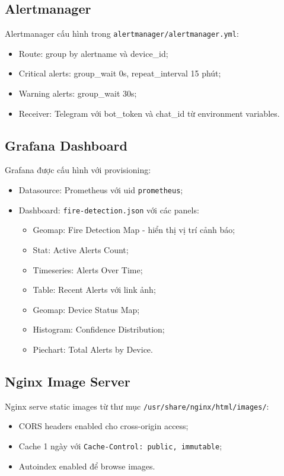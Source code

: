 \documentclass[12pt,a4paper]{report}
\begin{document}
\subsection{Alertmanager}

Alertmanager cấu hình trong \texttt{alertmanager/alertmanager.yml}:
\begin{itemize}
  \item Route: group by alertname và device\_id;
  \item Critical alerts: group\_wait 0s, repeat\_interval 15 phút;
  \item Warning alerts: group\_wait 30s;
  \item Receiver: Telegram với bot\_token và chat\_id từ environment variables.
\end{itemize}

\subsection{Grafana Dashboard}

Grafana được cấu hình với provisioning:
\begin{itemize}
  \item Datasource: Prometheus với uid \texttt{prometheus};
  \item Dashboard: \texttt{fire-detection.json} với các panels:
    \begin{itemize}
      \item Geomap: Fire Detection Map - hiển thị vị trí cảnh báo;
      \item Stat: Active Alerts Count;
      \item Timeseries: Alerts Over Time;
      \item Table: Recent Alerts với link ảnh;
      \item Geomap: Device Status Map;
      \item Histogram: Confidence Distribution;
      \item Piechart: Total Alerts by Device.
    \end{itemize}
\end{itemize}

\subsection{Nginx Image Server}

Nginx serve static images từ thư mục \texttt{/usr/share/nginx/html/images/}:
\begin{itemize}
  \item CORS headers enabled cho cross-origin access;
  \item Cache 1 ngày với \texttt{Cache-Control: public, immutable};
  \item Autoindex enabled để browse images.
\end{itemize}
\end{document}
